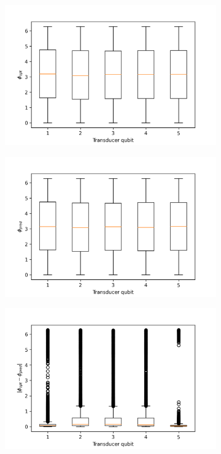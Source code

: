 \begin{figure}
\begin{subfigure}{0.32\textwidth}
	\end{subfigure}
	\begin{subfigure}{0.32\textwidth}
	\centering
	\includegraphics[width=\textwidth]{img/phi_opt_box}
\end{subfigure}
\begin{subfigure}{0.32\textwidth}
	\centering
	\includegraphics[width=\textwidth]{img/phi_pred_box}
\end{subfigure}
\begin{subfigure}{0.32\textwidth}
	\centering
	\includegraphics[width=\textwidth]{img/delta_phi_box}

\end{subfigure}
\end{figure}
